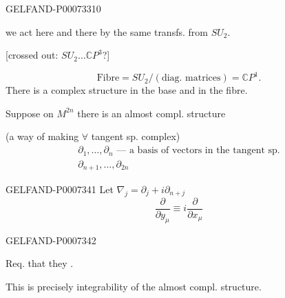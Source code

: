 \begin{GelfandAdjacentEvidence}{GELFAND-P000733}{10}

we act here and there by the same transfs. from \(SU_2\).

[crossed out: \(SU_2\ldots\mathbb C P^3\)?]
\end{GelfandAdjacentEvidence}


\[
\text{Fibre}=SU_2/(\text{diag. matrices})=\mathbb C P^1.
\]
There is a complex structure in the base and in the fibre.

Suppose on \(M^{2n}\) there is an almost compl. structure

(a way of making \(\forall\) tangent sp. complex)
\[
\begin{gathered}
\partial_1,\ldots,\partial_n\text{ --- a basis of vectors in the tangent sp.}\\
\partial_{n+1},\ldots,\partial_{2n}
\end{gathered}
\]


\begin{GelfandAdjacentEvidence}{GELFAND-P000734}{1}
Let \(\nabla_j=\partial_j+i\partial_{n+j}\)
\[
\frac{\partial}{\partial y_\mu}\equiv i\frac{\partial}{\partial x_\mu}
\]
\end{GelfandAdjacentEvidence}
\begin{GelfandAdjacentEvidence}{GELFAND-P000734}{2}

Req. that they .

This is precisely integrability of the almost compl. structure.
\end{GelfandAdjacentEvidence}



